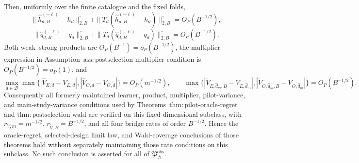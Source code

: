 Then, uniformly over the finite catalogue and the fixed folds,
\[
 \|\widehat h_{d,B}^{(-\ell)}-h_d\|_{2,B}^{\circ}
 +\|T_d(\widehat h_{d,B}^{(-\ell)}-h_d)\|_{2,B}^{\circ}
 =O_P(B^{-1/2}),                                               \tag{5}
\]
\[
 \|\widehat q_{d,B}^{(-\ell)}-q_d\|_{2,B}^{\circ}
 +\|T_d^\star(\widehat q_{d,B}^{(-\ell)}-q_d)\|_{2,B}^{\circ}
 =O_P(B^{-1/2}).                                               \tag{6}
\]
Both weak--strong products are \(O_P(B^{-1})=o_P(B^{-1/2})\), the multiplier expression in Assumption~\(\mathrm{ass{:}postselection\text{-}multiplier\text{-}condition}\) is \(O_P(B^{-1/2})=o_P(1)\), and
\[
 \max_{d\in\mathcal D}\max\bigl\{
 |\widehat V_{E,d}-V_{E,d}|,
 |\widehat V_{O,d}-V_{O,d}|\bigr\}=O_P(m^{-1/2}),
 \qquad
 \max\bigl\{
 |\widetilde V_{E,\widehat d_m,B}-V_{E,\widehat d_m}|,
 |\widetilde V_{O,\widehat d_m,B}-V_{O,\widehat d_m}|\bigr\}
 =O_P(B^{-1/2}).                                               \tag{7}
\]
Consequently all formerly maintained learner, product, multiplier, pilot-variance, and main-study-variance conditions used by Theorems~\(\mathrm{thm{:}pilot\text{-}oracle\text{-}regret}\) and \(\mathrm{thm{:}postselection\text{-}wald}\) are verified on this fixed-dimensional subclass, with \(r_{V,m}=m^{-1/2}\), \(r_{\widetilde V,B}=B^{-1/2}\), and all four bridge rates of order \(B^{-1/2}\).  Hence the oracle-regret, selected-design limit law, and Wald-coverage conclusions of those theorems hold without separately maintaining those rate conditions on this subclass.  No such conclusion is asserted for all of \(\mathfrak P_{\mathcal D}^{\mathrm{obs}}\).